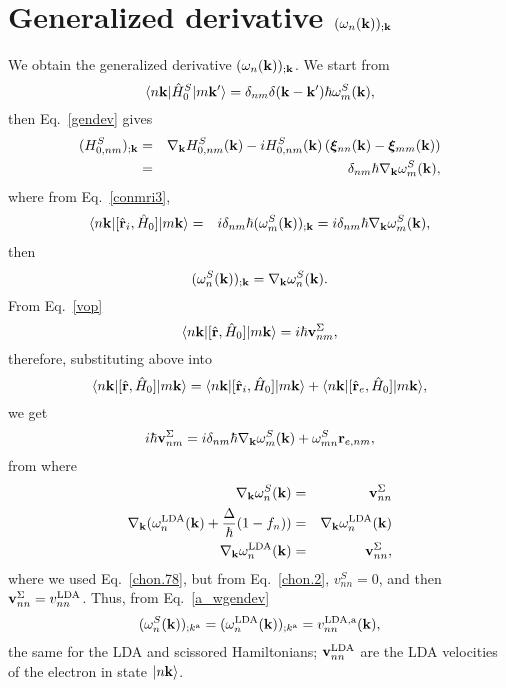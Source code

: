 \section{Generalized derivative $(\omega_n(\mathbf{k}))_{;\mathbf{k}}$}\label{gwk}

We obtain the
generalized derivative $(\omega_n(\mathbf{k}))_{;\mathbf{k}}$.
We start from
\begin{equation}\label{a_conH0}
\langle n\mathbf{k} |\hat{H}^S_0| m\mathbf{k}' \rangle=\delta_{nm}\delta(\mathbf{k}-\mathbf{k}')\hbar\omega^S_m(\mathbf{k})
,
\end{equation}
then Eq.~\eqref{gendev} gives
\begin{eqnarray}\label{a_genderH0}
(H^S_{0,nm})_{;\mathbf{k}}&=&
\nabla_{\mathbf{k}}
H^S_{0,n m}(\mathbf{k})
-
i
H^S_{0,nm}(\mathbf{k})
\left(
\boldsymbol{\xi}_{nn}(\mathbf{k})
-
\boldsymbol{\xi}_{mm}(\mathbf{k})
\right)
\nonumber\\
&=&\delta_{nm}\hbar\nabla_{\mathbf{k}}\omega^S_m(\mathbf{k})
,
\end{eqnarray}
where from Eq.~\eqref{conmri3}, 
\begin{eqnarray}\label{a_rih0}
\langle n\mathbf{k} |[\hat{\mathbf{r}}_i,\hat{H}_0]| m\mathbf{k} \rangle&=&
i\delta_{nm}\hbar(\omega^S_m(\mathbf{k}))_{;\mathbf{k}}
=
i\delta_{nm}\hbar\nabla_{\mathbf{k}}\omega^S_m(\mathbf{k})
,
\end{eqnarray}
then
\begin{equation}\label{a_wgendev}
(\omega^S_n(\mathbf{k}))_{;\mathbf{k}}=
\nabla_{\mathbf{k}}\omega^S_n(\mathbf{k})
.
\end{equation}
From Eq.~\eqref{vop} 
\begin{equation}\label{a_hr}
\langle n\mathbf{k} |[\hat{\mathbf{r}},\hat{H}_0]| m\mathbf{k} \rangle=
i\hbar\mathbf{v}^\Sigma_{nm}
,
\end{equation}
therefore, substituting above into
\begin{equation}\label{a_hrt}
\langle n\mathbf{k} |[\hat{\mathbf{r}},\hat{H}_0]| m\mathbf{k} \rangle=
\langle n\mathbf{k} |[\hat{\mathbf{r}}_i,\hat{H}_0]| m\mathbf{k} \rangle
+
\langle n\mathbf{k} |[\hat{\mathbf{r}}_e,\hat{H}_0]| m\mathbf{k} \rangle
,
\end{equation}
we get
\begin{equation}\label{a_hrt2}
i\hbar\mathbf{v}^\Sigma_{nm}=
i\delta_{nm}\hbar\nabla_{\mathbf{k}}\omega^S_m(\mathbf{k})
+
\omega^S_{mn}\mathbf{r}_{e,nm}
,
\end{equation}
from where
\begin{eqnarray}\label{a_gradw}
\nabla_{\mathbf{k}}\omega^S_n(\mathbf{k})
&=&
\mathbf{v}^\Sigma_{nn}
\nonumber\\
\nabla_{\mathbf{k}}(\omega^{\mathrm{LDA}}_n(\mathbf{k})+\frac{\Delta}{\hbar}(1-f_n))
&=&
\nabla_{\mathbf{k}}\omega^{\mathrm{LDA}}_n(\mathbf{k})
\nonumber\\
\nabla_{\mathbf{k}}\omega^{\mathrm{LDA}}_n(\mathbf{k})
&=&
\mathbf{v}^\Sigma_{nn}
,
\end{eqnarray}
where we used Eq.~\eqref{chon.78},
but from 
Eq.~\eqref{chon.2}, $v^S_{nn}=0$, and then
$\mathbf{v}^\Sigma_{nn}=v^{\mathrm{LDA}}_{nn}$.
Thus,  from Eq.~\eqref{a_wgendev}
\begin{equation}\label{a_gradw2}
(\omega^S_n(\mathbf{k}))_{;k^{\mathrm{a}}}=
(\omega^{\mathrm{LDA}}_n(\mathbf{k}))_{;k^{\mathrm{a}}}=
v^{\mathrm{LDA},\mathrm{a}}_{nn}(\mathbf{k})
,
\end{equation}
the same for the LDA and scissored Hamiltonians; $\mathbf{v}_{nn}^{\mathrm{LDA}}$ are
the LDA velocities of the electron in state $| n\mathbf{k} \rangle$.
